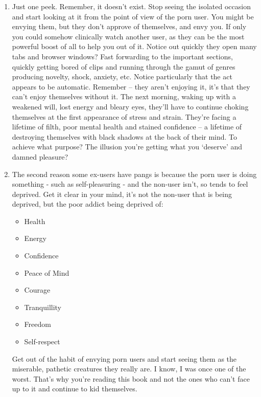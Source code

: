 \documentclass[
]{book}
\begin{document}
\begin{enumerate}
\def\labelenumi{\arabic{enumi}.}
\item
  Just one peek. Remember, it doesn't exist. Stop seeing the isolated occasion and start looking at it from the point of view of the porn user. You might be envying them, but they don't approve of themselves, and envy you. If only you could somehow clinically watch another user, as they can be the most powerful boost of all to help you out of it. Notice out quickly they open many tabs and browser windows? Fast forwarding to the important sections, quickly getting bored of clips and running through the gamut of genres producing novelty, shock, anxiety, etc. Notice particularly that the act appears to be automatic. Remember -- they aren't enjoying it, it's that they can't enjoy themselves without it. The next morning, waking up with a weakened will, lost energy and bleary eyes, they'll have to continue choking themselves at the first appearance of stress and strain. They're facing a lifetime of filth, poor mental health and stained confidence -- a lifetime of destroying themselves with black shadows at the back of their mind. To achieve what purpose? The illusion you're getting what you `deserve' and damned pleasure?
\item
  The second reason some ex-users have pangs is because the porn user is doing something - such as self-pleasuring - and the non-user isn't, so tends to feel deprived. Get it clear in your mind, it's not the non-user that is being deprived, but the poor addict being deprived of:

  \begin{itemize}
  \item
    Health
  \item
    Energy
  \item
    Confidence
  \item
    Peace of Mind
  \item
    Courage
  \item
    Tranquillity
  \item
    Freedom
  \item
    Self-respect
  \end{itemize}

  Get out of the habit of envying porn users and start seeing them as the miserable, pathetic creatures they really are. I know, I was once one of the worst. That's why you're reading this book and not the ones who can't face up to it and continue to kid themselves.
\end{enumerate}
\end{document}
